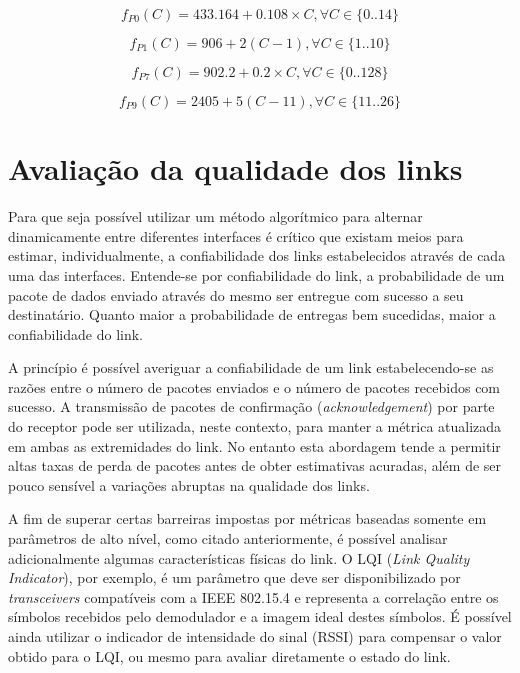 \documentclass{article}
\begin{document}
	\begin{equation}
		\label{eq:ch433msk}
		f_{P0}(C) = 433.164 + 0.108\times C, \forall C \in \{0..14\}
	\end{equation}
	
	\begin{equation}
		\label{eq:ch915ask}
		f_{P1}(C) = 906 + 2 (C - 1), \forall C \in \{1..10\}
	\end{equation}
	
	\begin{equation}
		\label{eq:ch915fsk}
		f_{P7}(C) = 902.2 + 0.2 \times C, \forall C \in \{0..128\}
	\end{equation}
		
	\begin{equation}
		\label{eq:ch2450oqpsk}
		f_{P9}(C) = 2405 + 5 (C - 11), \forall C \in \{11..26\}
	\end{equation}
\clearpage

\section{Avaliação da qualidade dos links}
	Para que seja possível utilizar um método algorítmico para alternar dinamicamente entre diferentes interfaces é crítico que existam meios para estimar, individualmente, a confiabilidade dos links estabelecidos através de cada uma das interfaces.  
	Entende-se por confiabilidade do link, a probabilidade de um pacote de dados enviado através do mesmo ser entregue com sucesso a seu destinatário. Quanto maior a probabilidade de entregas bem sucedidas, maior a confiabilidade do link. 

	A princípio é possível averiguar a confiabilidade de um link estabelecendo-se as razões entre o número de pacotes enviados e o número de pacotes recebidos com sucesso. A transmissão de pacotes de confirmação (\textit{acknowledgement}) por parte do receptor pode ser utilizada, neste contexto, para manter a métrica atualizada em ambas as extremidades do link. No entanto esta abordagem tende a permitir altas taxas de perda de pacotes antes de obter estimativas acuradas, além de ser pouco sensível a variações abruptas na qualidade dos links.
	
	A fim de superar certas barreiras impostas por métricas baseadas somente em parâmetros de alto nível, como citado anteriormente, é possível analisar adicionalmente algumas características físicas do link. O LQI (\textit{Link Quality Indicator}), por exemplo, é um parâmetro que deve ser disponibilizado por \textit{transceivers} compatíveis com a IEEE 802.15.4 e representa a correlação entre os símbolos recebidos pelo demodulador e a imagem ideal destes símbolos. É possível ainda utilizar o indicador de intensidade do sinal (RSSI) para compensar o valor obtido para o LQI, ou mesmo para avaliar diretamente o estado do link.
	
\end{document}
